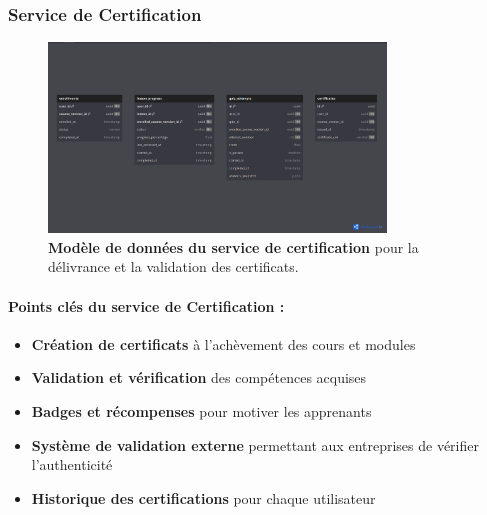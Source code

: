 \subsubsection{Service de Certification}
\begin{figure}[p]
  \centering
  \includegraphics[width=0.8\textwidth,keepaspectratio]{week_1_img/services_db_screanshots/Screenshot 2025-06-06 at 15-05-53 Certification_Service.pdf.png}
  \caption{\textbf{Modèle de données du service de certification} pour la délivrance et la validation des certificats.}
  \label{fig:certification_service}
\end{figure}

\vspace{5pt}
\small
\paragraph{Points clés du service de Certification :}
\begin{itemize}[leftmargin=*,noitemsep,topsep=0pt]
  \item \textbf{Création de certificats} à l'achèvement des cours et modules
  \item \textbf{Validation et vérification} des compétences acquises
  \item \textbf{Badges et récompenses} pour motiver les apprenants
  \item \textbf{Système de validation externe} permettant aux entreprises de vérifier l'authenticité
  \item \textbf{Historique des certifications} pour chaque utilisateur
\end{itemize}
\normalsize
\clearpage

